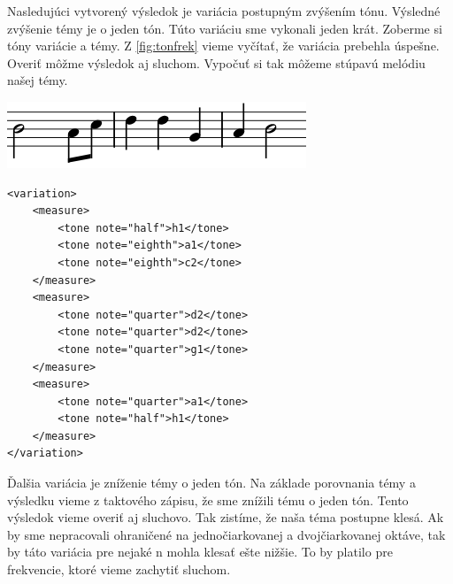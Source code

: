 Nasledujúci vytvorený výsledok je variácia postupným zvýšením tónu. Výsledné zvýšenie témy je o jeden tón. Túto variáciu sme vykonali jeden krát. Zoberme si tóny variácie a témy. Z \ref{fig:tonfrek} vieme vyčítať, že variácia prebehla úspešne. Overiť môžme výsledok aj sluchom. Vypočuť si tak môžeme stúpavú melódiu našej témy.

\begin{minipage}{.45\textwidth}
\includegraphics[width=\textwidth]{thesis/obrazky-figures/var3.png}
\end{minipage}%
\begin{minipage}{.5\textwidth}

\lstset{language=XML}
\begin{lstlisting}[basicstyle=\tiny]
<variation>
    <measure>
        <tone note="half">h1</tone>
        <tone note="eighth">a1</tone>
        <tone note="eighth">c2</tone>
    </measure>
    <measure>
        <tone note="quarter">d2</tone>
        <tone note="quarter">d2</tone>
        <tone note="quarter">g1</tone>
    </measure>
    <measure>
        <tone note="quarter">a1</tone>
        <tone note="half">h1</tone>
    </measure>
</variation>
\end{lstlisting}
\end{minipage}

Ďalšia variácia je zníženie témy o jeden tón. Na základe porovnania témy a výsledku vieme z taktového zápisu, že sme znížili tému o jeden tón. Tento výsledok vieme overiť aj sluchovo. Tak zistíme, že naša téma postupne klesá. Ak by sme nepracovali ohraničené na jednočiarkovanej a dvojčiarkovanej oktáve, tak by táto variácia pre nejaké n mohla klesať ešte nižšie. To by platilo pre frekvencie, ktoré vieme zachytiť sluchom.

